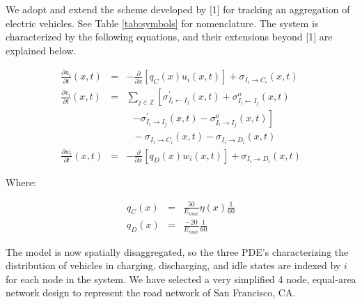 \documentclass[journal]{IEEEtran}
\begin{document}
We adopt and extend the scheme developed by [1] for tracking an aggregation of electric vehicles. See Table \ref{tab:symbols} for nomenclature. The system is characterized by the following equations, and their extensions beyond [1] are explained below. 

\begin{eqnarray*}
    \frac{\partial u_i}{\partial t}(x,t) &=& -\frac{\partial}{\partial x}\left[ q_C(x) u_i(x,t) \right] + \sigma_{I_i \rightarrow C_i}(x,t) \\
    \frac{\partial v_i}{\partial t}(x,t) &=& \sum_{j\in\mathbb{Z}} \left[ \sigma_{I_i \leftarrow I_j}^\prime(x,t) + \sigma_{I_i \leftarrow I_j}^o(x,t) \right. \\
    & & ~~~ \left. - \sigma_{I_i \rightarrow I_j}^\prime(x,t) - \sigma_{I_i \rightarrow I_j}^o(x,t) \right] \\
    && ~~~ - \sigma_{I_i \rightarrow C_i}(x,t) - \sigma_{I_i \rightarrow D_i}(x,t) \\
    \frac{\partial w_i}{\partial t}(x,t) &=& -\frac{\partial}{\partial x}\left[ q_D(x) w_i(x,t) \right] + \sigma_{I_i \rightarrow D_i}(x,t) 
\end{eqnarray*}

Where: 

\begin{eqnarray*}
q_C(x) &=& \frac{50}{E_{max}}\eta(x)\frac{1}{60} \\
q_D(x) &=& \frac{-20}{E_{max}}\frac{1}{60}
\end{eqnarray*}

The model is now spatially disaggregated, so the three PDE's characterizing the distribution of vehicles in charging, discharging, and idle states are indexed by $i$ for each node in the system. We have selected a very simplified 4 node, equal-area network design to represent the road network of San Francisco, CA. %
\end{document}
